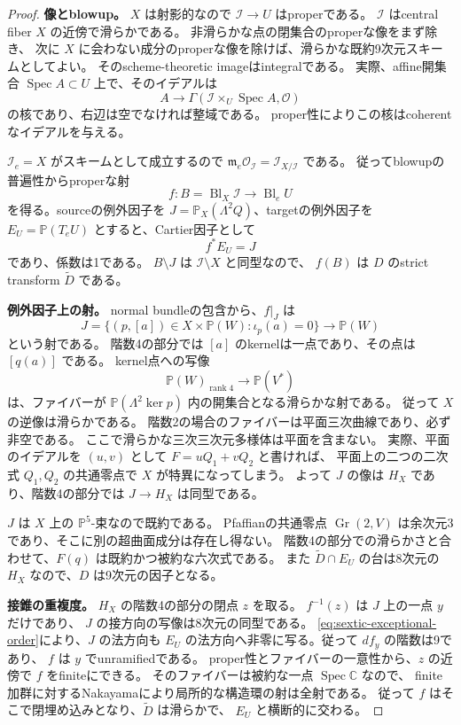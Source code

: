 \documentclass[a4paper,11pt]{ltjsarticle}
\theoremstyle{definition}
\newcommand{\CC}{\mathbb C}
\newcommand{\OO}{\mathcal O}
\newcommand{\PP}{\mathbb P}
\newcommand{\Gr}{\operatorname{Gr}}
\newcommand{\rk}{\operatorname{rank}}
\begin{document}
\begin{proof}
\textbf{像とblowup。}
$X$ は射影的なので $\mathcal I\to U$ はproperである。
$\mathcal I$ はcentral fiber $X$ の近傍で滑らかである。
非滑らかな点の閉集合のproperな像をまず除き、
次に $X$ に会わない成分のproperな像を除けば、滑らかな既約9次元スキームとしてよい。
そのscheme-theoretic imageはintegralである。
実際、affine開集合 $\operatorname{Spec}A\subset U$ 上で、そのイデアルは
\[
 A\longrightarrow\Gamma(\mathcal I\times_U\operatorname{Spec}A,\OO)
\]
の核であり、右辺は空でなければ整域である。
proper性によりこの核はcoherentなイデアルを与える。

$\mathcal I_e=X$ がスキームとして成立するので
$\mathfrak m_e\OO_{\mathcal I}=\mathcal I_{X/\mathcal I}$ である。
従ってblowupの普遍性からproperな射
\[
 f:B=\operatorname{Bl}_X\mathcal I\longrightarrow\operatorname{Bl}_eU
\]
を得る。sourceの例外因子を $J=\PP_X(\Lambda^2Q)$、targetの例外因子を
$E_U=\PP(T_eU)$ とすると、Cartier因子として
\begin{equation}\label{eq:sextic-exceptional-order}
                         f^*E_U=J
\end{equation}
であり、係数は1である。
$B\setminus J$ は $\mathcal I\setminus X$ と同型なので、
$f(B)$ は $D$ のstrict transform $\widetilde D$ である。

\textbf{例外因子上の射。}
normal bundleの包含から、$f|_J$ は
\[
 J=\{(p,[a])\in X\times\PP(W):\iota_p(a)=0\}
   \longrightarrow\PP(W)
\]
という射である。
階数4の部分では $[a]$ のkernelは一点であり、その点は $[q(a)]$ である。
kernel点への写像
\[
 \PP(W)_{\rk4}\longrightarrow\PP(V^*)
\]
は、ファイバーが $\PP(\Lambda^2\ker p)$ 内の開集合となる滑らかな射である。
従って $X$ の逆像は滑らかである。
階数2の場合のファイバーは平面三次曲線であり、必ず非空である。
ここで滑らかな三次三次元多様体は平面を含まない。
実際、平面のイデアルを $(u,v)$ として $F=uQ_1+vQ_2$ と書ければ、
平面上の二つの二次式 $Q_1,Q_2$ の共通零点で $X$ が特異になってしまう。
よって $J$ の像は $H_X$ であり、階数4の部分では $J\to H_X$ は同型である。

$J$ は $X$ 上の $\PP^5$-束なので既約である。
Pfaffianの共通零点 $\Gr(2,V)$ は余次元3であり、そこに別の超曲面成分は存在し得ない。
階数4の部分での滑らかさと合わせて、$F(q)$ は既約かつ被約な六次式である。
また $\widetilde D\cap E_U$ の台は8次元の $H_X$ なので、$D$ は9次元の因子となる。

\textbf{接錐の重複度。}
$H_X$ の階数4の部分の閉点 $z$ を取る。
$f^{-1}(z)$ は $J$ 上の一点 $y$ だけであり、
$J$ の接方向の写像は8次元の同型である。
\eqref{eq:sextic-exceptional-order}により、$J$ の法方向も
$E_U$ の法方向へ非零に写る。従って $df_y$ の階数は9であり、
$f$ は $y$ でunramifiedである。
proper性とファイバーの一意性から、$z$ の近傍で $f$ をfiniteにできる。
そのファイバーは被約な一点 $\operatorname{Spec}\CC$ なので、
finite加群に対するNakayamaにより局所的な構造環の射は全射である。
従って $f$ はそこで閉埋め込みとなり、$\widetilde D$ は滑らかで、
$E_U$ と横断的に交わる。


\end{proof}
\end{document}
